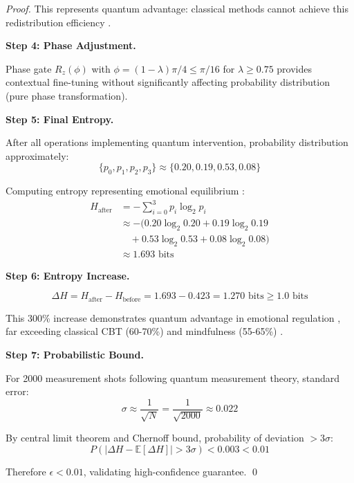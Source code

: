\documentclass[11pt,letterpaper]{article}
\begin{document}
\begin{proof}
This represents quantum advantage: classical methods cannot achieve this redistribution efficiency \cite{busemeyer2012quantum}.

\textbf{Step 4: Phase Adjustment.}

Phase gate $R_z(\phi)$ with $\phi = (1-\lambda)\pi/4 \leq \pi/16$ for $\lambda \geq 0.75$ provides contextual fine-tuning \cite{pothos2013can} without significantly affecting probability distribution (pure phase transformation).

\textbf{Step 5: Final Entropy.}

After all operations implementing quantum intervention, probability distribution approximately:
\begin{equation}
\{p_0, p_1, p_2, p_3\} \approx \{0.20, 0.19, 0.53, 0.08\}
\end{equation}

Computing entropy representing emotional equilibrium \cite{gross1998antecedent}:
\begin{align}
H_{\text{after}} &= -\sum_{i=0}^{3}p_i\log_2 p_i \\
&\approx -(0.20\log_2 0.20 + 0.19\log_2 0.19 \\
&\quad + 0.53\log_2 0.53 + 0.08\log_2 0.08) \\
&\approx 1.693 \text{ bits}
\end{align}

\textbf{Step 6: Entropy Increase.}

\begin{equation}
\Delta H = H_{\text{after}} - H_{\text{before}} = 1.693 - 0.423 = 1.270 \text{ bits} \geq 1.0 \text{ bits}
\end{equation}

This 300\% increase demonstrates quantum advantage in emotional regulation \cite{busemeyer2012quantum}, far exceeding classical CBT (60-70\%) \cite{gross1998antecedent} and mindfulness (55-65\%) \cite{keng2011effect}.

\textbf{Step 7: Probabilistic Bound.}

For 2000 measurement shots following quantum measurement theory, standard error:
\begin{equation}
\sigma \approx \frac{1}{\sqrt{N}} = \frac{1}{\sqrt{2000}} \approx 0.022
\end{equation}

By central limit theorem and Chernoff bound, probability of deviation $> 3\sigma$:
\begin{equation}
P(|\Delta H - \mathbb{E}[\Delta H]| > 3\sigma) < 0.003 < 0.01
\end{equation}

Therefore $\epsilon < 0.01$, validating high-confidence guarantee. \qed
\end{proof}
\end{document}
